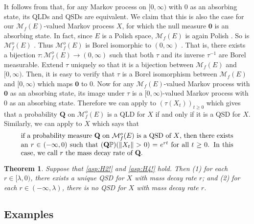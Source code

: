 \documentclass[12pt,a4paper]{amsart}
\numberwithin{equation}{section}
\theoremstyle{plain}
\newtheorem{thm}{Theorem}[section]
\theoremstyle{definition}
\theoremstyle{remark}
\begin{document}
	It follows from \cite[Proposition 1]{MeleardVillemonais2012Quasi-stationary} that, for any Markov process on $[0,\infty)$ with $0$ as an absorbing state, its QLDs and QSDs are equivalent.
	We claim that this is also the case for our $\mathcal M_f(E)$-valued Markov process $X$, for which the null measure $\mathbf 0$ is an absorbing state.
	In fact, since $E$ is a Polish space, $\mathcal M_f(E)$ is again Polish \cite[Lemma 4.3]{Kallenberg2017Random}.
	So is $\mathcal M^o_f(E)$ \cite[Theorem A1.2]{Kallenberg2002Foundations}.
	Thus $\mathcal M^o_f(E)$ is Borel isomorphic to $(0,\infty)$ \cite[Theorem A.1.6]{Kallenberg2002Foundations}.
	That is, there exists a bijection $\tau: \mathcal M^o_f(E) \to (0,\infty)$ such that both $\tau$ and its inverse $\tau^{-1}$ are Borel measurable.
	Extend $\tau$ uniquely so that it is a bijection between $\mathcal M_f(E)$ and $[0,\infty)$.
	Then, it is easy to verify that $\tau$ is a Borel isomorphism
	between $\mathcal M_f(E)$ and $[0,\infty)$ which maps $\mathbf 0$ to $0$.
	Now for any $\mathcal M_f(E)$-valued Markov process with $\mathbf 0$ as an absorbing state,
	its image under $\tau$ is a $[0,\infty)$-valued Markov process with $0$ as an absorbing state.
	Therefore we can apply \cite[Proposition 1]{MeleardVillemonais2012Quasi-stationary} to $(\tau(X_t))_{t\geq 0}$ which gives that
	a probability $\mathbf Q$ on $\mathcal M^o_f(E)$ is a QLD for $X$ if and only if it is a QSD for $X$.
	Similarly, we can apply \cite[Proposition 2]{MeleardVillemonais2012Quasi-stationary} to $X$ which says that
\begin{equation} \label{eq:S.2}
\begin{minipage}{0.9\textwidth}
	if a probability measure $\mathbf Q$ on $\mathcal M^o_f(E)$ is a QSD of $X$, then there exists an $r\in (-\infty,0)$ such that $(\mathbf Q\mathbb
    P)(\|X_t\|>0) = e^{rt}$ for all $t\geq 0$.
	In this case, we call $r$ the mass decay rate of $\mathbf Q$.
\end{minipage}
\end{equation}
	
\begin{thm} \label{thm:QSD}
	Suppose that \eqref{asp:H2!} and \eqref{asp:H4!} hold.
	Then (1) for each $r \in [\lambda, 0)$, there exists a unique QSD for $X$ with mass decay rate $r$;
	and (2) for each $r\in (-\infty, \lambda)$, there is no QSD for $X$ with mass decay rate $r$.
\end{thm}


 \subsection{Examples} \label{subsec:examples}
\end{document}
